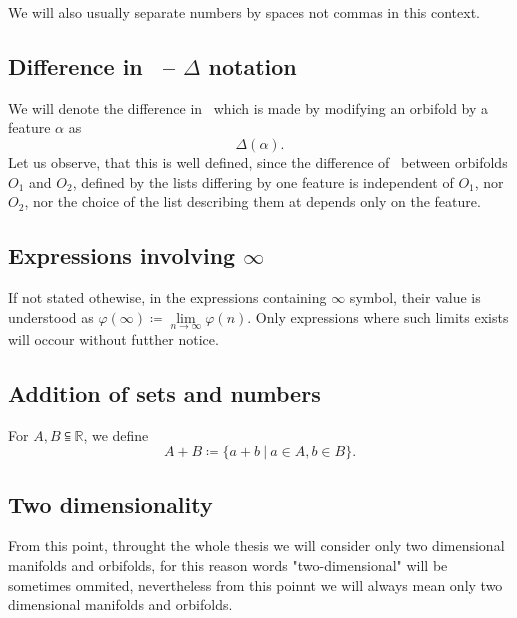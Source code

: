 We will also usually separate numbers by spaces not commas in this context. 

\subsection{Difference in \Eoc\ -- $\Delta$ notation}

We will denote the difference in \Eoc\ which is made by modifying 
an orbifold by a feature $\alpha$ as 
\begin{equation}
\Delta(\alpha).
\end{equation}
Let us observe, that this is well defined, since the difference of \Eoc\ between orbifolds 
$O_1$ and $O_2$, defined by the lists differing by one feature is independent of 
$O_1$, nor $O_2$, nor the choice of the list describing them at depends only on the feature.


\subsection{Expressions involving $\infty$}
If not stated othewise, in the expressions containing $\infty$ symbol, their value is understood 
as $\varphi(\infty) \coloneqq \lim\limits_{n\to \infty}\varphi(n)$. Only expressions 
where such limits exists will occour without futther notice.

\subsection{Addition of sets and numbers}
For $A, B \subseteqq \mathbb{R}$, we define 
\begin{equation}
A+B \coloneqq \{a+b\ |\ a \in A, b\in B\}.
\end{equation}

\subsection{Two dimensionality}
From this point, throught the whole thesis we will consider only two dimensional manifolds and 
orbifolds, for this reason words "two-dimensional" will be sometimes ommited, nevertheless 
from this poinnt we will always mean only two dimensional manifolds and orbifolds.  

